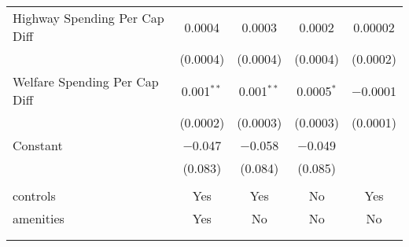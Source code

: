 \begin{table}[!htbp]
\begin{tabular}{@{\extracolsep{5pt}}lcccc}
  Highway Spending Per Cap Diff & 0.0004 & 0.0003 & 0.0002 & 0.00002 \\ 
  & (0.0004) & (0.0004) & (0.0004) & (0.0002) \\ 
  Welfare Spending Per Cap Diff & 0.001$^{**}$ & 0.001$^{**}$ & 0.0005$^{*}$ & $-$0.0001 \\ 
  & (0.0002) & (0.0003) & (0.0003) & (0.0001) \\ 
  Constant & $-$0.047 & $-$0.058 & $-$0.049 &  \\ 
  & (0.083) & (0.084) & (0.085) &  \\ 
 \hline \\[-1.8ex] 
controls & Yes & Yes & No & Yes \\ 
amenities & Yes & No & No & No \\ 
\hline \\[-1.8ex] 
\hline 
\hline \\[-1.8ex] 
\end{tabular} 
\end{table} 
